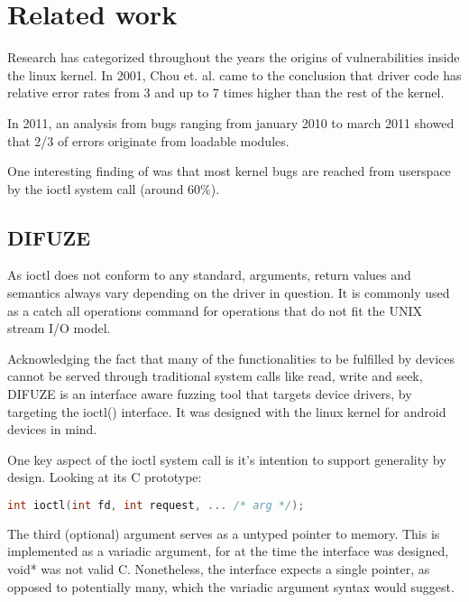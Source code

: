 \section{Related work}


Research has categorized throughout the years the origins of
vulnerabilities inside the linux kernel. In 2001,  Chou et. al.
came to the conclusion that driver code has relative error rates
from 3 and up to 7 times higher than the rest of the kernel\cite{chouEmpiricalStudyOperating2001}.

In 2011, an analysis from bugs ranging from january 2010 to march 2011
showed that 2/3 of errors originate from loadable modules\cite{chenLinuxKernelVulnerabilities2011}.

One interesting finding of \cite{vanderstoepAndroidProtectingKernel2016} was that most kernel bugs
are reached from userspace by the ioctl system call (around 60\%).


\subsection{DIFUZE}

As ioctl does not conform to any standard, arguments, return values and semantics always vary
depending on the driver in question. It is commonly used as a catch all operations command for
operations that do not fit the UNIX stream I/O model.

Acknowledging the fact that many of the functionalities to be fulfilled
by devices cannot be served through traditional system calls like read, write
and seek, DIFUZE is an interface aware fuzzing tool that targets
device drivers, by targeting the ioctl() interface\cite{corinaDIFUZEInterfaceAware2017}.
It was designed with the linux kernel for android devices in mind.


One key aspect of the ioctl system call is it's intention to support generality by design.
Looking at its C prototype:

\begin{lstlisting}[language=c]
  int ioctl(int fd, int request, ... /* arg */);
\end{lstlisting}

The third (optional) argument serves as a untyped pointer to memory. This is implemented as a variadic argument, for at the time
the interface was designed, void* was not valid C. Nonetheless, the interface expects a single pointer, as opposed to potentially
many, which the variadic argument syntax would suggest.

